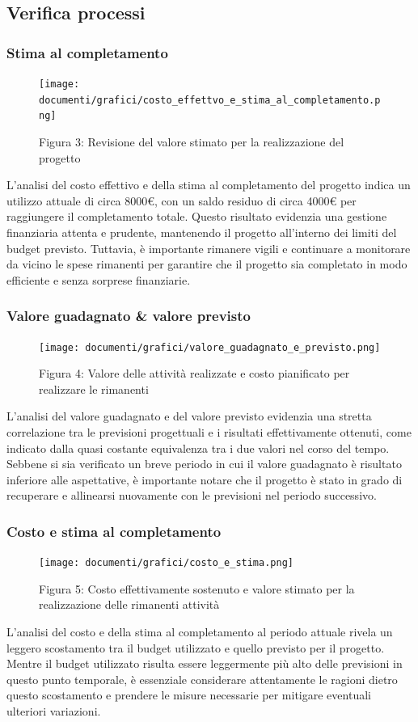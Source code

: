 \documentclass{article}
\begin{document}
\subsection{Verifica processi}
\subsubsection{Stima al completamento}
\begin{figure}[H]
    \centering
    \texttt{[image: documenti/grafici/costo\_effettvo\_e\_stima\_al\_completamento.png]}
    \caption{Figura 3: Revisione del valore stimato per la realizzazione del progetto}
    \end{figure}
    L'analisi del costo effettivo e della stima al completamento del progetto indica un utilizzo attuale di circa 8000€, con un saldo residuo di circa 4000€ per raggiungere il completamento totale. Questo risultato evidenzia una gestione finanziaria attenta e prudente, mantenendo il progetto all'interno dei limiti del budget previsto. Tuttavia, è importante rimanere vigili e continuare a monitorare da vicino le spese rimanenti per garantire che il progetto sia completato in modo efficiente e senza sorprese finanziarie.
\subsubsection{Valore guadagnato \& valore previsto}
\begin{figure}[H]
    \centering
    \texttt{[image: documenti/grafici/valore\_guadagnato\_e\_previsto.png]}
    \caption{Figura 4: Valore delle attività realizzate e costo pianificato per realizzare le rimanenti}
    \end{figure}
    L'analisi del valore guadagnato e del valore previsto evidenzia una stretta correlazione tra le previsioni progettuali e i risultati effettivamente ottenuti, come indicato dalla quasi costante equivalenza tra i due valori nel corso del tempo. Sebbene si sia verificato un breve periodo in cui il valore guadagnato è risultato inferiore alle aspettative, è importante notare che il progetto è stato in grado di recuperare e allinearsi nuovamente con le previsioni nel periodo successivo.
\subsubsection{Costo e stima al completamento}
    
    \begin{figure}[H]
    \centering
    \texttt{[image: documenti/grafici/costo\_e\_stima.png]}
    \caption{Figura 5: Costo effettivamente sostenuto e valore stimato per la realizzazione delle rimanenti attività}
\end{figure}
L'analisi del costo e della stima al completamento al periodo attuale rivela un leggero scostamento tra il budget utilizzato e quello previsto per il progetto. Mentre il budget utilizzato risulta essere leggermente più alto delle previsioni in questo punto temporale, è essenziale considerare attentamente le ragioni dietro questo scostamento e prendere le misure necessarie per mitigare eventuali ulteriori variazioni.
\end{document}
